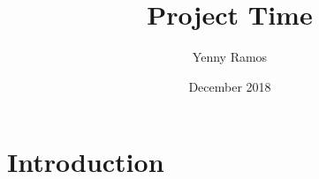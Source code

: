 \documentclass{article}
\title{Project Time}
\author{Yenny Ramos}
\date{December 2018}
\begin{document}
\maketitle

\section{Introduction}
\end{document}
